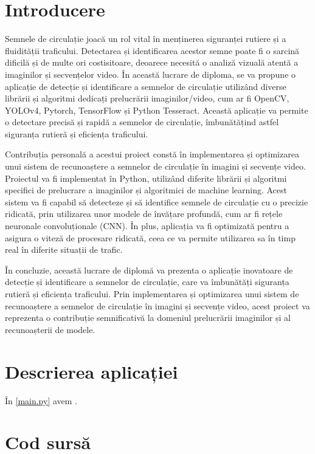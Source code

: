 \documentclass[12pt, a4paper, twoside, romanian]{teza-etti}
\begin{document}
\beforepreface{}
\listoffigures
\listoftables
{}
\afterpreface{}

\chapter{Introducere}
Semnele de circulație joacă un rol vital în menținerea siguranței rutiere și a fluidității traficului.
Detectarea și identificarea acestor semne poate fi o sarcină dificilă și de multe ori costisitoare,
deoarece necesită o analiză vizuală atentă a imaginilor și secvențelor video.
În această lucrare de diploma, se va propune o aplicație de detecție și identificare a semnelor de circulație utilizând diverse librării și algoritmi dedicați prelucrării imaginilor/video, cum ar fi OpenCV, YOLOv4, Pytorch, TensorFlow și Python Tesseract. Această aplicație va permite o detectare precisă și rapidă a semnelor de circulație, îmbunătățind astfel siguranța rutieră și eficiența traficului.

Contribuția personală a acestui proiect constă în implementarea și optimizarea unui sistem de recunoaștere a semnelor de circulație în imagini și secvențe video. Proiectul va fi implementat în Python, utilizând diferite librării și algoritmi specifici de prelucrare a imaginilor și algoritmici de machine learning. Acest sistem va fi capabil să detecteze și să identifice semnele de circulație cu o precizie ridicată, prin utilizarea unor modele de învățare profundă, cum ar fi rețele neuronale convoluționale (CNN). În plus, aplicația va fi optimizată pentru a asigura o viteză de procesare ridicată, ceea ce va permite utilizarea sa în timp real în diferite situații de trafic.

În concluzie, această lucrare de diplomă va prezenta o aplicație inovatoare de detecție și identificare a semnelor de circulație, care va îmbunătăți siguranța rutieră și eficiența traficului. Prin implementarea și optimizarea unui sistem de recunoaștere a semnelor de circulație în imagini și secvențe video, acest proiect va reprezenta o contribuție semnificativă la domeniul prelucrării imaginilor și al recunoașterii de modele.

\chapter{Descrierea aplicației}
În {\ref{main.py}} avem .
\appendix
\chapter{Cod sursă}

% 
% 
\end{document}
